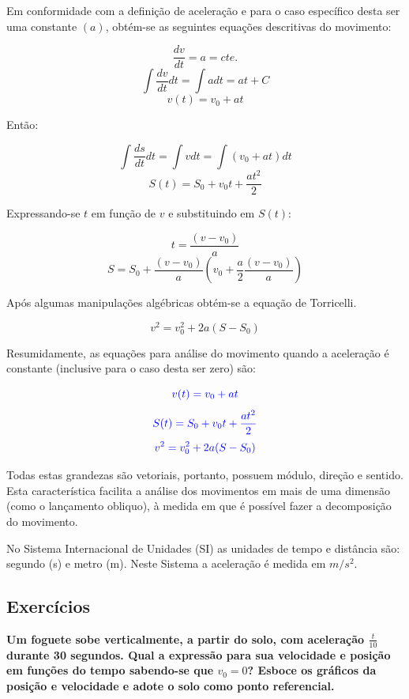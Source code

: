 \documentclass[
    12pt, %
    openright,
    twoside, %
    a4paper, %
    article,
    english,brazil %
]{abntex2}
\begin{document}
Em conformidade com a definição de aceleração e para o caso específico desta ser uma constante $(a)$, obtém-se as seguintes equações descritivas do movimento:

$$ \frac{dv}{dt} = a = cte. $$
$$ \int \frac{dv}{dt} dt = \int a dt = at + C $$
$$ v(t) = v_0 + at $$

Então:

$$ \int \frac{ds}{dt} dt = \int v dt = \int (v_0 + at) dt $$
$$ S(t) = S_0 + v_0 t + \frac{a t^2}{2} $$

Expressando-se $t$ em função de $v$ e substituindo em $S(t)$:

$$t = \frac{(v - v_0)}{a}$$
$$S = S_0 + \frac{(v - v_0)}{a}(v_0 + \frac{a}{2}\frac{(v - v_0)}{a})$$

Após algumas manipulações algébricas obtém-se a equação de Torricelli. 

$$v^2 = v_0^2 + 2a(S-S_0)$$

Resumidamente, as equações para análise do movimento quando a aceleração é constante (inclusive para o caso desta ser zero) são:

\begin{equation}
    \color{blue}
    v(t) = v_0 + at
\end{equation}
\begin{equation}
    \color{blue}
    S(t) = S_0 + v_0t + \frac{at^2}{2}    
\end{equation}
\begin{equation}
    \color{blue}
    v^2 = v_0^2 + 2a(S - S_0)
\end{equation}

Todas estas grandezas são vetoriais, portanto, possuem módulo, direção e sentido. Esta característica facilita a análise dos movimentos em mais de uma dimensão (como o lançamento obliquo), à medida em que é possível fazer a decomposição do movimento.

No Sistema Internacional de Unidades (SI) as unidades de tempo e distância são: segundo (s) e metro (m). Neste Sistema a aceleração é medida em $m/s^2$.

\subsection{Exercícios}

\textbf{Um foguete sobe verticalmente, a partir do solo, com aceleração $\frac{t}{10}$ durante 30 segundos. Qual a expressão para sua velocidade e posição em funções do tempo sabendo-se que $v_0 = 0$? Esboce os gráficos da posição e velocidade e adote o solo como ponto referencial.}
\end{document}
